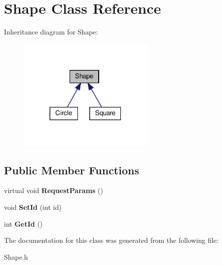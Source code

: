 \hypertarget{classShape}{}\section{Shape Class Reference}
\label{classShape}


Inheritance diagram for Shape\+:
\nopagebreak
\begin{figure}[H]
\begin{center}
\leavevmode
\includegraphics[width=188pt]{classShape__inherit__graph}
\end{center}
\end{figure}
\subsection*{Public Member Functions}
\begin{DoxyCompactItemize}
\item 
\mbox{\label{classShape_a677f57ffcd291adc2fe1bb884cd80576}} 
virtual void {\bfseries Request\+Params} ()
\item 
\mbox{\label{classShape_ae80ee2a092e3042b0ccaa2c7dcf6e04b}} 
void {\bfseries Set\+Id} (int id)
\item 
\mbox{\label{classShape_a619cb49e2f5acdbecf216f262fa2a85f}} 
int {\bfseries Get\+Id} ()
\end{DoxyCompactItemize}


The documentation for this class was generated from the following file\+:\begin{DoxyCompactItemize}
\item 
Shape.\+h\end{DoxyCompactItemize}
